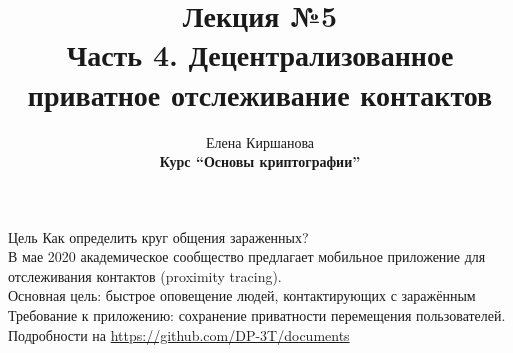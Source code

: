 \documentclass[usenames,dvipsnames,8pt,aspectratio=169]{beamer}
\title{Лекция №5 \\[10pt]
	Часть 4. Децентрализованное приватное отслеживание контактов}
\date{ Елена Киршанова \\  \textbf{Курс ``Основы криптографии''} \\  }
\begin{document}
	
\begin{frame}
	\titlepage
\end{frame}

\begin{frame}{Цель}
	\Large 
		{\color{Orange}  Как определить круг общения зараженных? }\\[15pt]


	В мае 2020 	академическое сообщество предлагает мобильное приложение для  {\color{Orange} отслеживания  контактов (proximity tracing).}\\[10pt]
	
	Основная цель: быстрое оповещение людей, контактирующих с заражённым \\[10pt]
	
	{\color{Orange} Требование к приложению:} сохранение {\color{Orange}приватности} перемещения пользователей.  \\
	
	
	
	\vfill
	Подробности на \url{https://github.com/DP-3T/documents}
	
\end{frame}
\end{document}
